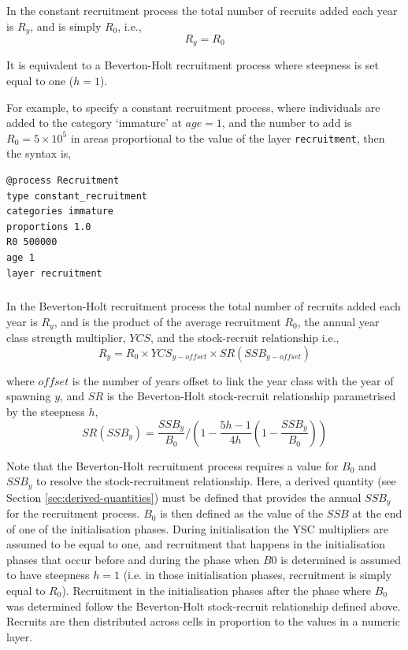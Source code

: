 \subsubsection*{}

In the constant recruitment process the total number of recruits added each year is $R_y$, and is simply $R_0$, i.e.,
\begin{equation}
  R_y = R_0
\end{equation}

It is equivalent to a Beverton-Holt recruitment process where steepness is set equal to one ($h=1$).

For example, to specify a constant recruitment process, where individuals are added to the category `immature' at $age=1$, and the number to add is $R_0=5 \times 10^5$ in areas proportional to the value of the layer \texttt{recruitment}, then the syntax is,

{\small{\begin{verbatim}
@process Recruitment
type constant_recruitment
categories immature
proportions 1.0
R0 500000
age 1
layer recruitment
\end{verbatim}}}

\subsubsection*{}

In the Beverton-Holt recruitment process the total number of recruits added each year is $R_y$, and is the product of the average recruitment $R_0$, the annual year class strength multiplier, $YCS$, and the stock-recruit relationship i.e.,
\begin{equation}
  R_y = R_0 \times YCS_{y-offset} \times SR(SSB_{y-offset})
\end{equation}
  
where $offset$ is the number of years offset to link the year class with the year of spawning $y$, and $SR$ is the Beverton-Holt stock-recruit relationship parametrised by the steepness $h$,
\begin{equation}
SR(SSB_y) = \frac{SSB_y}{B_0} / \left( 1-\frac{5h-1}{4h} \left( 1-\frac{SSB_y}{B_0} \right) \right)
\end{equation}

Note that the Beverton-Holt recruitment process requires a value for $B_0$ and $SSB_y$ to resolve the stock-recruitment relationship. Here, a derived quantity (see Section \ref{sec:derived-quantities}) must be defined that provides the annual $SSB_y$ for the recruitment process. $B_0$ is then defined as the value of the $SSB$ at the end of one of the initialisation phases. During initialisation the YSC multipliers are assumed to be equal to one, and recruitment that happens in the initialisation phases that occur before and during the phase when $B0$ is determined is assumed to have steepness $h=1$ (i.e. in those initialisation phases, recruitment is simply equal to $R_0$). Recruitment in the initialisation phases after the phase where $B_0$ was determined follow the Beverton-Holt stock-recruit relationship defined above. Recruits are then distributed across cells in proportion to the values in a numeric layer. 

